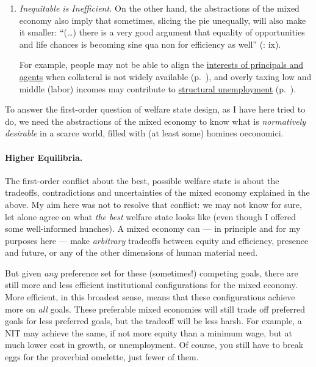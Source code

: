 \begin{enumerate}
\begin{enumerate}
		\item \emph{Inequitable is Inefficient.} On the other hand, the abstractions of the mixed economy also imply that sometimes, slicing the pie unequally, will also make it smaller: ``(\ldots) there is a very good argument that equality of opportunities and life chances is becoming sine qua non for efficiency as well'' (\citealt{Esping-Andersen2002}: ix).
		
		For example, people may not be able to align the \hyperref[sec:principal-agent-problem]{interests of principals and agents} when collateral is not widely available (p.~\pageref{sec:principal-agent-problem}), and overly taxing low and middle (labor) incomes may contribute to \hyperref[sec:minimalDWL]{structural unemployment} (p.~\pageref{sec:minimalDWL}).
	\end{enumerate}
	
	To answer the first-order question of welfare state design, as I have here tried to do, we need the abstractions of the mixed economy to know what is \emph{normatively desirable} in a scarce world, filled with (at least some) homines oeconomici.	
\end{enumerate}

\paragraph[Higher Equilibria]{Higher Equilibria.} The first-order conflict about the best, possible welfare state is about the tradeoffs, contradictions and uncertainties of the mixed economy explained in the above. My aim here was not to resolve that conflict: we may not know for sure, let alone agree on what \emph{the best} welfare state looks like (even though I offered some well-informed hunches). A mixed economy can --- in principle and for my purposes here --- make \emph{arbitrary} tradeoffs between equity and efficiency, presence and future, or any of the other dimensions of human material need. 

But given \emph{any} preference set for these (sometimes!) competing goals, there are still more and less efficient institutional configurations for the mixed economy. More efficient, in this broadest sense, means that these configurations achieve more on \emph{all} goals. These preferable mixed economies will still trade off preferred goals for less preferred goals, but the tradeoff will be less harsh. For example, a \gls{NIT} may achieve the same, if not more equity than a minimum wage, but at much lower cost in growth, or unemployment. Of course, you still have to break eggs for the proverbial omelette, just fewer of them.

